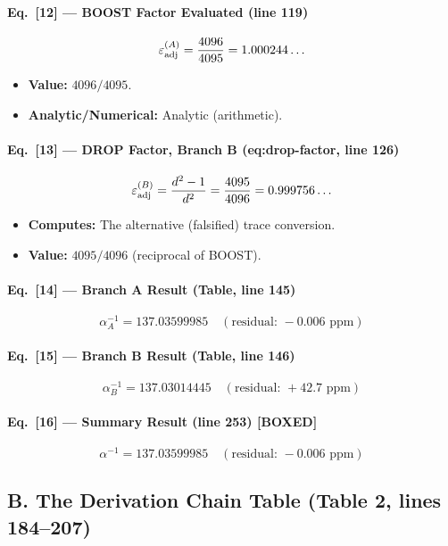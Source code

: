 \paragraph{Eq.\ [12] --- BOOST Factor Evaluated (line 119)}
\[
  \varepsilon_{\rm adj}^{(A)} = \frac{4096}{4095} = 1.000244\ldots
\]
\begin{itemize}
  \item \textbf{Value:} $4096/4095$.
  \item \textbf{Analytic/Numerical:} Analytic (arithmetic).
\end{itemize}

\paragraph{Eq.\ [13] --- DROP Factor, Branch B (eq:drop-factor, line 126)}
\[
  \varepsilon_{\rm adj}^{(B)} = \frac{d^2 - 1}{d^2} = \frac{4095}{4096} = 0.999756\ldots
\]
\begin{itemize}
  \item \textbf{Computes:} The alternative (falsified) trace conversion.
  \item \textbf{Value:} $4095/4096$ (reciprocal of BOOST).
\end{itemize}

\paragraph{Eq.\ [14] --- Branch A Result (Table, line 145)}
\[
  \alpha^{-1}_A = 137.03599985 \quad (\text{residual: } -0.006 \text{ ppm})
\]

\paragraph{Eq.\ [15] --- Branch B Result (Table, line 146)}
\[
  \alpha^{-1}_B = 137.03014445 \quad (\text{residual: } +42.7 \text{ ppm})
\]

\paragraph{Eq.\ [16] --- Summary Result (line 253) \textbf{[BOXED]}}
\[
  \boxed{\alpha^{-1} = 137.03599985 \quad
  (\text{residual: } {-}0.006\text{ ppm})}
\]

\subsection*{B. The Derivation Chain Table (Table 2, lines 184--207)}

